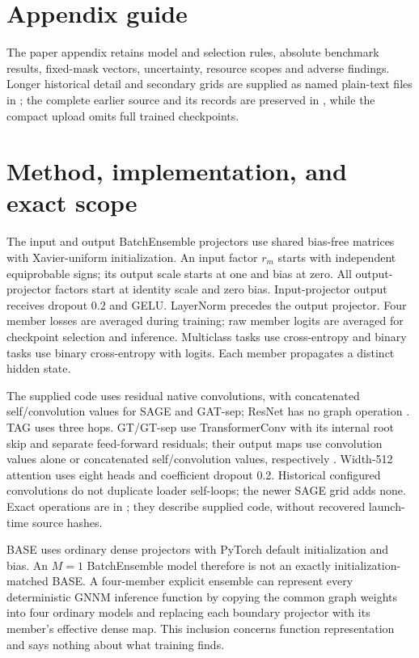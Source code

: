 \section*{Appendix guide}
The paper appendix retains model and selection rules, absolute benchmark results, fixed-mask vectors, uncertainty, resource scopes and adverse findings. Longer historical detail and secondary grids are supplied as named plain-text files in ; the complete earlier source and its records are preserved in , while the compact upload omits full trained checkpoints.

\section{Method, implementation, and exact scope}\label{app:implementation}
The input and output BatchEnsemble projectors use shared bias-free matrices
with Xavier-uniform initialization. An input factor $r_m$ starts with
independent equiprobable signs; its output scale starts at one and bias at
zero. All output-projector factors start at identity scale and zero bias.
Input-projector output receives dropout $0.2$ and GELU. LayerNorm precedes
the output projector. Four member losses are averaged during training;
raw member logits are averaged for checkpoint selection and inference.
Multiclass tasks use cross-entropy and binary tasks use binary
cross-entropy with logits. Each member propagates a distinct hidden state.

The supplied code uses residual native convolutions, with concatenated self/convolution values for SAGE and GAT-sep; ResNet has no graph operation \citep{kipf2017semi,hamilton2017inductive,velickovic2018graph,du2017topology,brody2022how,fey2019pyg}. TAG uses three hops. GT/GT-sep use TransformerConv with its internal root skip and separate feed-forward residuals; their output maps use convolution values alone or concatenated self/convolution values, respectively \citep{shi2021masked}. Width-512 attention uses eight heads and coefficient dropout 0.2. Historical configured convolutions do not duplicate loader self-loops; the newer SAGE grid adds none. Exact operations are in ; they describe supplied code, without recovered launch-time source hashes.

BASE uses ordinary dense projectors with PyTorch default initialization
and bias. An $M=1$ BatchEnsemble model therefore is not an exactly
initialization-matched BASE. A four-member explicit ensemble can represent
every deterministic GNNM inference function by copying the common graph
weights into four ordinary models and replacing each boundary projector
with its member's effective dense map. This inclusion concerns function
representation and says nothing about what training finds.

